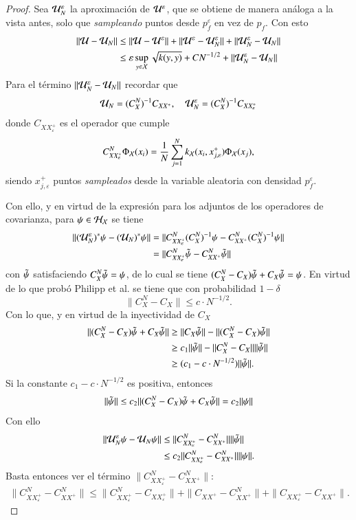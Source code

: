\begin{proof}
    Sea $\mathcal{U}^\varepsilon_N$ la aproximación de $\mathcal{U}^\varepsilon$, que se obtiene de manera análoga a la vista antes, solo que \textit{sampleando} puntos desde $p^\varepsilon_f$ en vez de $p_f$. Con esto
\[
\begin{aligned}
    \| \mathcal{U} - \mathcal{U}_N \| & \leq \| \mathcal{U} - \mathcal{U}^\varepsilon \| + \| \mathcal{U}^\varepsilon - \mathcal{U}_N^\varepsilon \| + \| \mathcal{U}_N^\varepsilon - \mathcal{U}_N \| \\
    & \leq \varepsilon \sup_{y \in \mathcal{X}} \sqrt{k(y,y)} + C N^{-1/2} + \| \mathcal{U}_N^\varepsilon - \mathcal{U}_N \| 
\end{aligned}
\]
Para el término $\| \mathcal{U}_N^\varepsilon - \mathcal{U}_N \|$ recordar que
\[
\mathcal{U}_N = (C_X^N)^{-1} C_{XX^+}, \quad \mathcal{U}_N^\varepsilon = (C_X^N)^{-1} C_{XX^+_\varepsilon}
\]
donde $C_{XX^+_\varepsilon}$ es el operador que cumple
\[
 C_{XX^+_\varepsilon}^N \Phi_{\mathcal{X}} (x_i) = \frac{1}{N} \sum_{j = 1}^N k_{\mathcal{X}}(x_i, x_{j, \varepsilon}^+) \Phi_{\mathcal{X}} (x_j),
\]
siendo $ x_{j, \varepsilon}^+$ puntos \textit{sampleados} desde la variable aleatoria con densidad $p_f^\varepsilon$. 

Con ello, y en virtud de la expresión para los adjuntos de los operadores de covarianza, para $\psi \in \mathcal{H}_{\mathcal{X}}$ se tiene
\[
\begin{aligned}
    \| (\mathcal{U}_N^\varepsilon)^* \psi - (\mathcal{U}_N)^* \psi \| & = \| C_{XX_\varepsilon^+}^N (C_X^N)^{-1} \psi - C_{XX^+}^N (C_X^N)^{-1} \psi \| \\
    & = \| C_{XX_\varepsilon^+}^N \Tilde{\psi}  - C_{XX^+}^N \Tilde{\psi} \|
\end{aligned}
\]
con $\Tilde{\psi}$ satisfaciendo $C_X^N \Tilde{\psi} = \psi$, de lo cual se tiene $(C_X^N - C_X) \Tilde{\psi} + C_X \Tilde{\psi} = \psi$. En virtud de lo que probó Philipp et al. se tiene que con probabilidad $1-\delta$
\[
\| C^N_X - C_X \| \leq c \cdot N^{-1/2}.
\]
Con lo que, y en virtud de la inyectividad de $C_X$
\[
\begin{aligned}
    \| (C_X^N - C_X) \Tilde{\psi} + C_X \Tilde{\psi}\| & \geq \| C_X \Tilde{\psi} \| - \| (C_X^N - C_X) \Tilde{\psi} \| \\
    & \geq c_1 \| \Tilde{\psi} \| - \|C_X^N - C_X \| \| \Tilde{\psi}\| \\
    & \geq (c_1 - c \cdot N^{-1/2}) \| \Tilde{\psi}\|.
\end{aligned}
\]
Si la constante $c_1 - c \cdot N^{-1/2}$ es positiva, entonces
\[
\| \Tilde{\psi} \| \leq c_2 \|(C_X^N - C_X) \Tilde{\psi} + C_X \Tilde{\psi} \| = c_2 \| \psi \|
\]
Con ello
\[
\begin{aligned}
    \| \mathcal{U}_N^\varepsilon \psi - \mathcal{U}_N \psi \| & \leq \| C_{XX_\varepsilon^+}^N - C_{XX^+}^N  \| \| \Tilde{\psi} \| \\
    & \leq c_2 \| C_{XX_\varepsilon^+}^N - C_{XX^+}^N  \| \| \psi \|.
\end{aligned}
\]
Basta entonces ver el término $\| C_{XX_\varepsilon^+}^N - C_{XX^+}^N  \|$:
\[
\begin{aligned}
    \| C_{XX_\varepsilon^+}^N - C_{XX^+}^N  \| \leq \| C_{XX_\varepsilon^+}^N - C_{XX^+_\varepsilon} \| +  \| C_{XX^+} - C_{XX^+}^N \| + \| C_{XX_\varepsilon^+} - C_{XX^+} \|.
\end{aligned}
\]


\end{proof}

